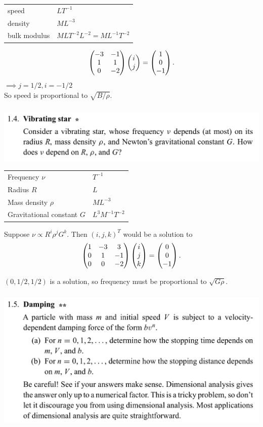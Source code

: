 \begin{tabular}{l|l}
  speed   & $LT^{-1}$ \\
  density & $ML^{-3}$ \\
  bulk modulus & $MLT^{-2}L^{-2} = ML^{-1}T^{-2}$
\end{tabular}

\begin{align*}
  \begin{pmatrix}-3 & -1\\1 & 1\\0 & -2\\ \end{pmatrix} \begin{pmatrix}i\\j\end{pmatrix} = \begin{pmatrix}1\\0\\-1\end{pmatrix}.
\end{align*}
$\implies j = 1/2, i = -1/2$\\
So speed is proportional to $\sqrt{B/\rho}$. \checkmark

\subsubsection*{}
\begin{mdframed}
  \includegraphics[width=400pt]{img/physics--classical-mechanics--morin--1-4.png}
\end{mdframed}
\begin{tabular}{l|l}
  Frequency $\nu$            & $T^{-1}$ \\
  Radius $R$                 & $L$ \\
  Mass density $\rho$        & $ML^{-3}$ \\
  Gravitational constant $G$ & $L^3M^{-1}T^{-2}$
\end{tabular}

Suppose $\nu \propto R^i\rho^jG^k$. Then $(i, j, k)^T$ would be a solution to
\begin{align*}
  \begin{pmatrix}1 & -3 & 3\\0 & 1 & -1\\0 & 0 & -2\\ \end{pmatrix} \begin{pmatrix}i\\j\\k\end{pmatrix} = \begin{pmatrix}0\\0\\-1\end{pmatrix}.
\end{align*}

$(0, 1/2, 1/2)$ is a solution, so frequency must be proportional to $\sqrt{G\rho}$. \checkmark

\subsubsection*{}
\begin{mdframed}
  \includegraphics[width=400pt]{img/physics--classical-mechanics--morin--1-5.png}
\end{mdframed}

